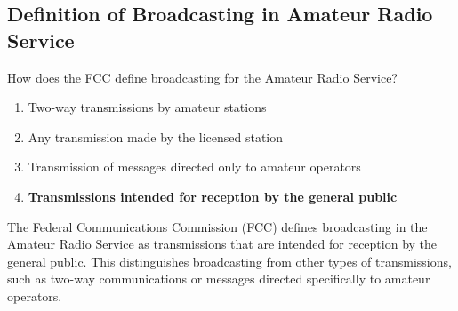 \subsection{Definition of Broadcasting in Amateur Radio Service}
\label{T1D10}

\begin{tcolorbox}[colback=gray!10!white,colframe=black!75!black,title=T1D10]
How does the FCC define broadcasting for the Amateur Radio Service?
\begin{enumerate}[label=\Alph*,noitemsep]
    \item Two-way transmissions by amateur stations
    \item Any transmission made by the licensed station
    \item Transmission of messages directed only to amateur operators
    \item \textbf{Transmissions intended for reception by the general public}
\end{enumerate}
\end{tcolorbox}

The Federal Communications Commission (FCC) defines broadcasting in the Amateur Radio Service as transmissions that are intended for reception by the general public. This distinguishes broadcasting from other types of transmissions, such as two-way communications or messages directed specifically to amateur operators.